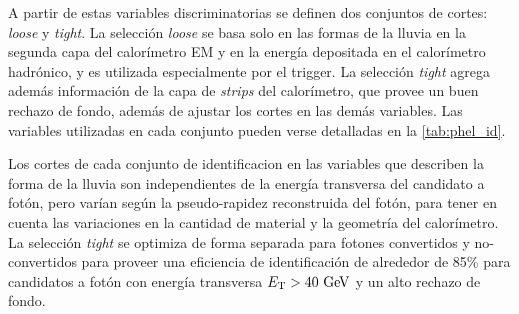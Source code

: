 A partir de estas variables discriminatorias se definen dos conjuntos de cortes: \emph{loose} y
\emph{tight}.
La selección \emph{loose} se basa solo en las formas de la lluvia
en la segunda capa del calorímetro EM y en la energía depositada en el
calorímetro hadrónico, y es utilizada especialmente por el trigger. La selección
\emph{tight} agrega además información de la capa de \emph{strips} del calorímetro, que
provee un buen rechazo de fondo, %
además de ajustar los cortes en las
demás variables. Las variables utilizadas en cada conjunto pueden verse detalladas
en la \cref{tab:phel_id}.

Los cortes de cada conjunto de identificacion en las variables que
describen la forma de la lluvia son independientes de la energía transversa del
candidato a fotón, pero varían según la pseudo-rapidez reconstruida del fotón,
para tener en cuenta las variaciones en la cantidad de material y la geometría
del calorímetro.
La selección \emph{tight} se optimiza de forma separada para
fotones convertidos y no-convertidos para proveer una eficiencia de
identificación de alrededor de 85\% para candidatos a fotón con energía
transversa $\et>40 \gev$ y un alto rechazo de fondo\cite{PhotonPerf}.



